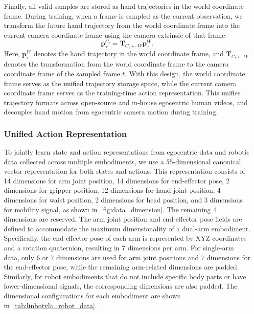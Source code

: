 Finally, all valid samples are stored as hand trajectories in the world coordinate frame. During training, when a frame is sampled as the current observation, we transform the future hand trajectory from the world coordinate frame into the current camera coordinate frame using the camera extrinsic of that frame:
\begin{equation}
    \mathbf{p}_{\tau}^{C_t} = \mathbf{T}_{C_t \leftarrow W} \mathbf{p}_{\tau}^{W}.
\end{equation}
Here, $\mathbf{p}_{\tau}^{W}$ denotes the hand trajectory in the world coordinate frame, and $\mathbf{T}_{C_t \leftarrow W}$ denotes the transformation from the world coordinate frame to the camera coordinate frame of the sampled frame $t$. With this design, the world coordinate frame serves as the unified trajectory storage space, while the current camera coordinate frame serves as the training-time action representation. This unifies trajectory formats across open-source and in-house egocentric human videos, and decouples hand motion from egocentric camera motion during training.

\subsubsection{Unified Action Representation} 

To jointly learn state and action representations from egocentric data and robotic data collected across multiple embodiments, we use a 55-dimensional canonical vector representation for both states and actions. This representation consists of 14 dimensions for arm joint position, 14 dimensions for end-effector pose, 2 dimensions for gripper position, 12 dimensions for hand joint position, 4 dimensions for waist position, 2 dimensions for head position, and 3 dimensions for mobility signal, as shown in~\cref{fig:data_dimension}. The remaining 4 dimensions are reserved.
The arm joint position and end-effector pose fields are defined to accommodate the maximum dimensionality of a dual-arm embodiment. Specifically, the end-effector pose of each arm is represented by XYZ coordinates and a rotation quaternion, resulting in 7 dimensions per arm. For single-arm data, only 6 or 7 dimensions are used for arm joint positions and 7 dimensions for the end-effector pose, while the remaining arm-related dimensions are padded.
Similarly, for robot embodiments that do not include specific body parts or have lower-dimensional signals, the corresponding dimensions are also padded.
The dimensional configurations for each embodiment are shown in~\cref{tab:linbotvla_robot_data}.

